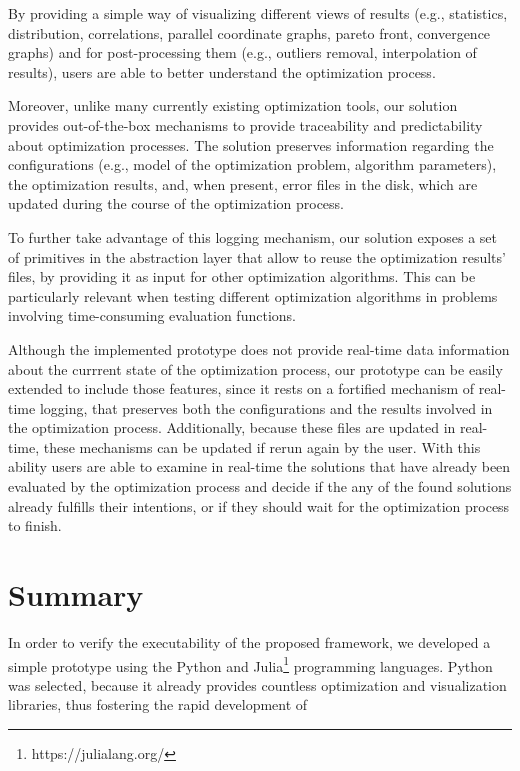 By providing a simple way of visualizing different views of results (e.g., statistics, distribution, correlations, parallel coordinate graphs, pareto front, convergence graphs) and for post-processing them (e.g., outliers removal, interpolation of results), users are able to better understand the optimization process. 

Moreover, unlike many currently existing optimization tools, our solution provides out-of-the-box mechanisms to provide traceability and predictability about optimization processes. The solution preserves information regarding the configurations (e.g., model of the optimization problem, algorithm parameters), the optimization results, and, when present, error files in the disk, which are updated during the course of the optimization process. 

To further take advantage of this logging mechanism, our solution exposes a set of primitives in the abstraction layer that allow to reuse the optimization results' files, by providing it as input for other optimization algorithms. This can be particularly relevant when testing different optimization algorithms in problems involving time-consuming evaluation functions.


Although the implemented prototype does not provide real-time data information about the currrent state of the optimization process, our prototype can be easily extended to include those features, since it rests on a fortified mechanism of real-time logging, that preserves both the configurations and the results involved in the optimization process. Additionally, because these files are updated in real-time, these mechanisms can be updated if rerun again by the user. With this ability users are able to examine in real-time the solutions that have already been evaluated by the optimization process and decide if the any of the found solutions already fulfills their intentions, or if they should wait for the optimization process to finish. 


\section{Summary}
In order to verify the executability of the proposed framework, we developed a simple prototype using the Python and Julia\footnote{https://julialang.org/} programming languages. Python was selected, because it already provides countless optimization and visualization libraries, thus fostering the rapid development of 


